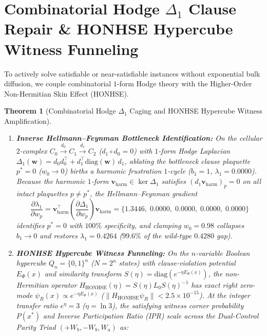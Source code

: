 \documentclass[11pt,a4paper]{article}
\newtheorem{theorem}{Theorem}[section]
\theoremstyle{definition}
\begin{document}
\section{Combinatorial Hodge $\Delta_1$ Clause Repair \& HONHSE Hypercube Witness Funneling}

To actively solve satisfiable or near-satisfiable instances without exponential bulk diffusion, we couple combinatorial $1$-form Hodge theory with the Higher-Order Non-Hermitian Skin Effect (HONHSE).

\begin{theorem}[Combinatorial Hodge $\Delta_1$ Caging and HONHSE Hypercube Witness Amplification]
\label{thm:honhse_sat}
\leavevmode
\begin{enumerate}
    \item \textbf{Inverse Hellmann--Feynman Bottleneck Identification:} On the cellular $2$-complex $C_0 \xrightarrow{d_0} C_1 \xrightarrow{d_1} C_2$ ($d_1\circ d_0 = 0$) with $1$-form Hodge Laplacian $\Delta_1(\mathbf{w}) = d_0 d_0^\top + d_1^\top \mathrm{diag}(\mathbf{w})\, d_1$, ablating the bottleneck clause plaquette $p^* = 0$ ($w_0 \to 0$) births a harmonic frustration $1$-cycle ($b_1 = 1$, $\lambda_1 = 0.0000$). Because the harmonic $1$-form $\mathbf{v}_{\mathrm{harm}} \in \ker\Delta_1$ satisfies $(d_1\mathbf{v}_{\mathrm{harm}})_p = 0$ on all intact plaquettes $p \neq p^*$, the Hellmann--Feynman gradient
    \begin{equation}
    \frac{\partial \lambda_1}{\partial w_p} = \mathbf{v}_{\mathrm{harm}}^\top \left(\frac{\partial \Delta_1}{\partial w_p}\right) \mathbf{v}_{\mathrm{harm}} = \{1.3446,\; 0.0000,\; 0.0000,\; 0.0000,\; 0.0000\}
    \end{equation}
    identifies $p^* = 0$ with $100\%$ specificity, and clamping $w_0 = 0.98$ collapses $b_1 \to 0$ and restores $\lambda_1 = 0.4264$ ($99.6\%$ of the wild-type $0.4280$ gap).
    \item \textbf{HONHSE Hypercube Witness Funneling:} On the $n$-variable Boolean hypercube $Q_n = \{0,1\}^n$ ($N = 2^n$ states) with clause-violation potential $E_\Phi(x)$ and similarity transform $S(\eta) = \mathrm{diag}(e^{-\eta E_\Phi(x)})$, the non-Hermitian operator $H_{\mathrm{HONHSE}}(\eta) = S(\eta) L_0 S(\eta)^{-1}$ has exact right zero-mode $\psi_R(x) \propto e^{-\eta E_\Phi(x)}$ ($\|H_{\mathrm{HONHSE}}\psi_R\| < 2.5\times 10^{-15}$). At the integer transfer ratio $e^\eta = 3$ ($\eta = \ln 3$), the satisfying witness corner probability $P(x^*)$ and Inverse Participation Ratio (IPR) scale across the Dual-Control Parity Triad $(+W_b, -W_b, W_a)$ as:

\end{enumerate}
\end{theorem}
\end{document}
